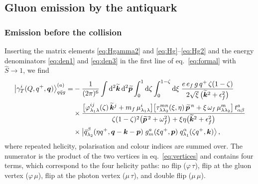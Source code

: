 \subsection{Gluon emission by the antiquark}
\label{sec:qbar}

\subsubsection{Emission before the collision}
\label{sec:before}

Inserting the matrix elements \eqref{eq:Hgamma2} and \eqref{eq:Hg}--\eqref{eq:Hg2} and the energy
denominators \eqref{eq:den1} and \eqref{eq:den3} in the first line of eq.~\eqref{eq:formal} with
$\hat S\to1$, we find
\begin{align}
\big|\gamma_T^i(Q,q^+,\bm{q})\big\rangle^{(a)}_{q\bar q g}=&-\frac{1}{(2\pi)^6}\int{\rm d}^2\widetilde{\bm{k}}\,{\rm d}^2\widetilde{\bm{p}}
\int_0^1{\rm d}\zeta\int_0^{1-\zeta}{\rm d}\xi\;
\frac{e\,e_f\,g\,q^+\,\zeta(1-\zeta)}{2\sqrt\xi\,\big(\widetilde{\bm{k}}^2+\epsilon_f^2\big)}
\nonumber\\
&\times\frac{\big[\varphi^{ij}_{\lambda_1\lambda}(\zeta)\,\widetilde{\bm{k}}^j+m_f\,\mu^i_{\lambda_1\lambda}\big]
\big[\tau^{mn}_{\lambda\lambda_2}(\xi,\eta)\,\widetilde{\bm{p}}^{\,n}+\xi\,\omega_f\,\mu^m_{\lambda\lambda_2}\big]\,t^a_{\alpha\beta}}
{\zeta(1-\zeta)^2\big(\widetilde{\bm{p}}^{\,2}+\omega_f^2\big)+\xi\eta\big(\widetilde{\bm{k}}^2+\epsilon_f^2\big)}
\nonumber\\
&\times\big|\bar q^\beta_{\lambda_2}(\eta q^+,\bm{q}-\bm{k}-\bm{p})\;g^a_m(\xi q^+,\bm{p})\;q^\alpha_{\lambda_1}(\zeta q^+,\bm{k})\big\rangle\,,
\label{eq:wf-mom}
\end{align}
where repeated helicity, polarisation and colour indices are summed over. The numerator is the product
of the two vertices in eq.~\eqref{eq:vertices} and contains four terms, which correspond to the four
helicity paths: no flip ($\varphi\,\tau$), flip at the gluon vertex ($\varphi\,\mu$), flip at the photon
vertex ($\mu\,\tau$), and double flip ($\mu\,\mu$).


